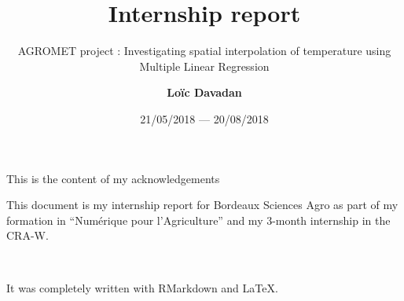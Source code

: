 \documentclass[12pt,twoside]{reedthesis}
\title{Internship report}
\author{\textbf{Loïc Davadan}}
\date{21/05/2018 --- 20/08/2018}
\subtitle{AGROMET project : Investigating spatial interpolation of temperature
using Multiple Linear Regression}
\theoremstyle{definition}
\theoremstyle{definition}
\theoremstyle{definition}
\theoremstyle{remark}
\begin{document}
  \maketitle

\frontmatter %
\pagestyle{empty} %
  \begin{acknowledgements}
    This is the content of my acknowledgements
  \end{acknowledgements}
  \begin{preface}
    This document is my internship report for Bordeaux Sciences Agro as part
    of my formation in ``Numérique pour l'Agriculture'' and my 3-month
    internship in the CRA-W.
    
    ~
    
    It was completely written with RMarkdown and \LaTeX.
  \end{preface}
\end{document}
